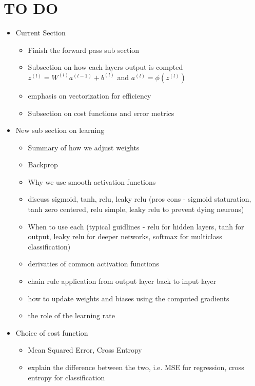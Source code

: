 \documentclass[9pt]{extarticle}
\begin{document}
\pagebreak
\section*{TO DO}
\scriptsize
\begin{itemize}
    \item Current Section
          \begin{itemize}
              \item Finish the forward pass  sub section
              \item Subsection on how  each layers output is compted $z^{(l)} = W^{(l)}a^{(l-1)} + b^{(l)}$ and $a^{(l)} = \phi(z^{(l)})$
              \item emphasis on vectorization for efficiency
              \item Subsection on cost functions and error metrics
          \end{itemize}
    \item New sub section on learning
          \begin{itemize}
              \item Summary of how we adjust weights
              \item Backprop
              \item Why we use smooth activation functions
              \item discuss sigmoid, tanh, relu, leaky relu (pros cons - sigmoid staturation, tanh zero centered, relu simple, leaky relu to prevent dying neurons)
              \item When to use each (typical guidlines - relu for hidden layers, tanh for output, leaky relu for deeper networks, softmax for multiclass classification)
              \item  derivaties of common activation functions
              \item chain rule application from output layer back to input layer
              \item how to update weights and biases using the computed gradients
              \item the role of the learning rate
          \end{itemize}
    \item Choice of cost function
          \begin{itemize}
              \item Mean Squared Error, Cross Entropy
              \item explain the difference between the two, i.e. MSE for regression, cross entropy for classification
          \end{itemize}


\end{itemize}
\end{document}
